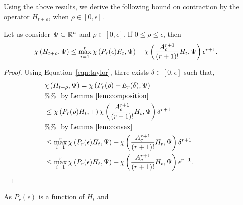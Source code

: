 Using the above results, we derive the following bound on contraction
by the operator $H_{t+\rho}$, when $\rho\in[0,\epsilon]$.
%
\begin{lemma}\label{lem:conv}
Let us consider $\Psi\subset\mathbb{R}^n$ and $\rho\in[0,\epsilon]$.  If
$0\leq \rho\leq \epsilon$, then
%
\begin{align*}
& \chi\left(H_{t+\rho},\Psi\right)\leq\max_{i=1}^r\chi\left(P_r(\epsilon)H_t,\Psi\right)+\chi\left(\frac{A_c^{r+1}}{(r+1)!}H_t,\Psi\right)\epsilon^{r+1}.
\end{align*}
%
\end{lemma}
%
\begin{proof}
Using Equation~\ref{eqn:taylor}, there exists
$\delta\in[0,\epsilon]$ such that,
%
\begin{align*}
&
  \chi\left(H_{t+\rho},\Psi\right)=\chi\left(P_r(\rho)+E_r(\delta),\Psi\right)\\
& \%\%~~\text{by Lemma~\ref{lem:composition}}\\
&
  \leq\chi\left(P_r(\rho)H_t,+\right)\chi\left(\frac{A_c^{r+1}}{(r+1)!}H_t,\Psi\right)\delta^{r+1}\\
  & \%\%~~\text{by Lemma~\ref{lem:convex}}\\
&
  \leq\max_{i=1}^r\chi\left(P_r(\epsilon)H_t,\Psi\right)+\chi\left(\frac{A_c^{r+1}}{(r+1)!}H_t,\Psi\right)\delta^{r+1}\\
& \leq\max_{i=1}^r\chi\left(P_r(\epsilon)H_t,\Psi\right)+\chi\left(\frac{A_c^{r+1}}{(r+1)!}H_t,\Psi\right)\epsilon^{r+1}.\hspace{3em}\qedhere
\end{align*}
%
\end{proof}
%
As $P_r(\epsilon)$ is a function of $H_t$ and 
